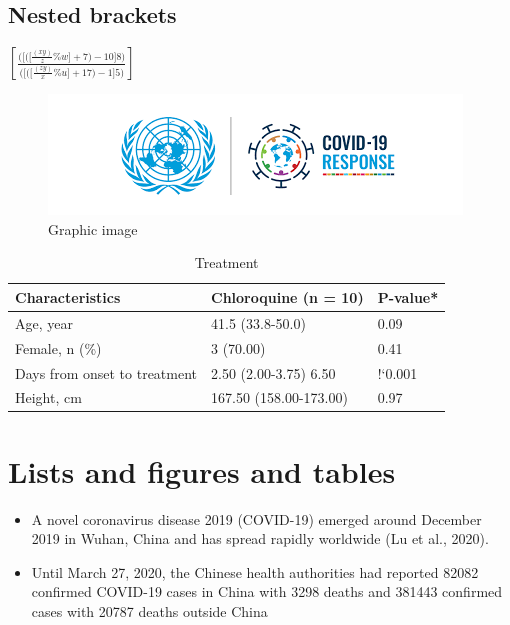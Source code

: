\documentclass[10pt]{article}
\begin{document}
\subsection{Nested brackets}

$
\left[\frac{\Bigg(\bigg[\Big(\big[\frac{(xy)}{z}\%w\big]+7\Big)-10\bigg]8\Bigg)}{\Bigg(\bigg[\Big(\big[\frac{(zy)}{x}\%u\big]+17\Big)-1\bigg]5\Bigg)}\right]
$


\newpage

\begin{figure}
\centering
\label{fig:label1}
\includegraphics[scale=0.7]{covid.png}
\caption{Graphic image}
\end{figure}

\begin{table}[hbt!]
\begin{center}
\begin{tabular}{| l | l | l |}
\hline
Characteristics & Chloroquine (n = 10) & P-value* \\
\hline\hline
Age, year & 41.5 (33.8-50.0) & 0.09 \\
\hline
Female, n (\%) & 3 (70.00) & 0.41 \\
\hline
Days from onset to treatment & 2.50 (2.00-3.75) 6.50 & !`0.001 \\
\hline
Height, cm & 167.50 (158.00-173.00) & 0.97 \\
\hline


\end{tabular}
\end{center}
\caption{Treatment}
\label{tab:table1}
\end{table}
\section{Lists and figures and tables}
\label{section:sec2}

\begin{itemize}
\item A novel coronavirus disease 2019 (COVID-19) emerged around December
2019 in Wuhan, China and has spread rapidly worldwide (Lu et al., 2020).

\item Until March 27, 2020, the Chinese health authorities had reported 82082
confirmed COVID-19 cases in China with 3298 deaths and 381443 confirmed cases with 20787 deaths outside China
\end{itemize}
\end{document}
